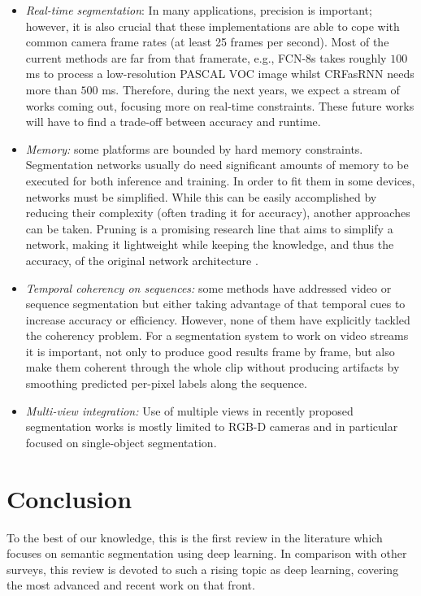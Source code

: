 \begin{itemize}
	\item \emph{Real-time segmentation}: In many applications, precision is important; however, it is also crucial that these implementations are able to cope with common camera frame rates (at least 25 frames per second). Most of the current methods are far from that framerate, e.g., \acs{FCN}-8s takes roughly $100$ ms to process a low-resolution PASCAL \acs{VOC} image whilst \acs{CRF}as\acs{RNN} needs more than $500$ ms. Therefore, during the next years, we expect a stream of works coming out, focusing more on real-time constraints. These future works will have to find a trade-off between accuracy and runtime.
	\item \emph{Memory:} some platforms are bounded by hard memory constraints. Segmentation networks usually do need significant amounts of memory to be executed for both inference and training. In order to fit them in some devices, networks must be simplified. While this can be easily accomplished by reducing their complexity (often trading it for accuracy), another approaches can be taken. Pruning is a promising research line that aims to simplify a network, making it lightweight while keeping the knowledge, and thus the accuracy, of the original network architecture \cite{Anwar2015}\cite{Han2015}\cite{Molchanov2016}.
	\item \emph{Temporal coherency on sequences:} some methods have addressed video or sequence segmentation but either taking advantage of that temporal cues to increase accuracy or efficiency. However, none of them have explicitly tackled the coherency problem. For a segmentation system to work on video streams it is important, not only to produce good results frame by frame, but also make them coherent through the whole clip without producing artifacts by smoothing predicted per-pixel labels along the sequence.
	\item \emph{Multi-view integration:} Use of multiple views in recently proposed segmentation works is mostly limited to RGB-D cameras and in particular focused on single-object segmentation.
\end{itemize}

\section{Conclusion}
\label{cha:semseg:sec:conclusion}

To the best of our knowledge, this is the first review in the literature which focuses on semantic segmentation using deep learning. In comparison with other surveys, this review is devoted to such a rising topic as deep learning, covering the most advanced and recent work on that front.

